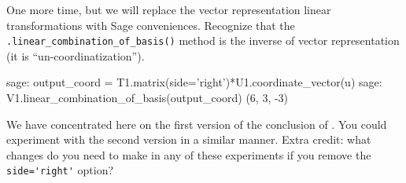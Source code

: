 %
One more time, but we will replace the vector representation linear transformations with Sage conveniences.  Recognize that the \verb?.linear_combination_of_basis()? method is the inverse of vector representation (it is ``un-coordinatization'').
%
\begin{sageexample}
sage: output_coord = T1.matrix(side='right')*U1.coordinate_vector(u)
sage: V1.linear_combination_of_basis(output_coord)
(6, 3, -3)
\end{sageexample}
%
We have concentrated here on the first version of the conclusion of .  You could experiment with the second version in a similar manner.  Extra credit: what changes do you need to make in any of these experiments if you remove the \verb?side='right'? option?
%
\begin{sageverbatim}
\end{sageverbatim}
%